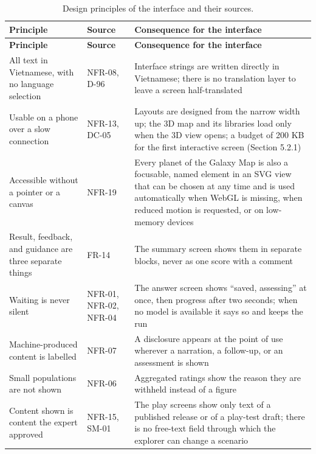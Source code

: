 {\small{}\renewcommand{\arraystretch}{1.1}
\begin{longtable}{|>{\raggedright\arraybackslash}p{}|>{\raggedright\arraybackslash}p{}|>{\raggedright\arraybackslash}p{}|}
\caption{Design principles of the interface and their sources.} \\
\hline
\textbf{Principle} & \textbf{Source} & \textbf{Consequence for the interface} \\ \hline
\endfirsthead
\hline
\textbf{Principle} & \textbf{Source} & \textbf{Consequence for the interface} \\ \hline
\endhead
All text in Vietnamese, with no language selection & NFR-08, D-96 & Interface strings are written directly in Vietnamese; there is no translation layer to leave a screen half-\allowbreak{}translated \\ \hline
Usable on a phone over a slow connection & NFR-13, DC-05 & Layouts are designed from the narrow width up; the 3D map and its libraries load only when the 3D view opens; a budget of 200 KB for the first interactive screen (Section 5.2.1) \\ \hline
Accessible without a pointer or a canvas & NFR-19 & Every planet of the Galaxy Map is also a focusable, named element in an SVG view that can be chosen at any time and is used automatically when WebGL is missing, when reduced motion is requested, or on low-memory devices \\ \hline
Result, feedback, and guidance are three separate things & FR-14 & The summary screen shows them in separate blocks, never as one score with a comment \\ \hline
Waiting is never silent & NFR-01, NFR-02, NFR-04 & The answer screen shows ``saved, assessing'' at once, then progress after two seconds; when no model is available it says so and keeps the run \\ \hline
Machine-\allowbreak{}produced content is labelled & NFR-07 & A disclosure appears at the point of use wherever a narration, a follow-up, or an assessment is shown \\ \hline
Small populations are not shown & NFR-06 & Aggregated ratings show the reason they are withheld instead of a figure \\ \hline
Content shown is content the expert approved & NFR-15, SM-01 & The play screens show only text of a published release or of a play-test draft; there is no free-text field through which the explorer can change a scenario \\ \hline
\end{longtable}
}

